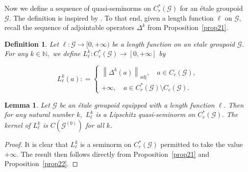 \documentclass[a4paper,11pt,reqno]{amsart}
\theoremstyle{plain}
\newtheorem{lem}[thm]{Lemma}
\newtheorem{defn}[thm]{Definition}
\theoremstyle{named}
\numberwithin{equation}{section}
\begin{document}
			
			Now we define a sequence of quasi-seminorms on $C^{\ast}_{r}(\mathcal G)$ for an étale groupoid $\mathcal G.$ The definition is inspired by \cite[Section 3]{Long-Wu-2017-Twisted-group-C-alg-as-CQMS}. To that end, given a length function $\ell$ on $\mathcal G$, recall the sequence of adjointable operators $\Delta^{k}$ from Proposition~\ref{prop21}.
			\begin{defn}\label{defn12}
				Let $\ell :\mathcal{G}\to [0,+\infty)$ be a length function on an etale groupoid $\mathcal{G}$.  For any $k \in \mathbb N,$ we define $L_{\ell}^{k}:C_{r}^{\ast}(\mathcal{G})\to [0,+\infty]$ by
				
				$$L_{\ell}^k (a) : = \begin{cases} \left \|\Delta^k (a) \right \|_{\mathrm {adj}}, \quad a \in C_c (\mathcal G), \\ + \infty, \quad a \in C_r^{\ast} (\mathcal G) \setminus C_c (\mathcal G). \end{cases}$$
			\end{defn}
			
			\begin{lem}
				Let $\mathcal G$ be an étale groupoid equipped with a length function $\ell$. Then for any natural number $k,$ $L_{\ell}^k$ is a Lipschitz quasi-seminorm on $C_r^{\ast} (\mathcal G).$ The kernel of $L_{\ell}^{k}$ is $C(\mathcal G^{(0)})$ for all $k$.
			\end{lem}
			
			\begin{proof}
				It is clear that $L_{\ell}^k$ is a seminorm on $C_r^{\ast} (\mathcal G)$ permitted to take the value $+\infty.$ The result then follows directly from Proposition~\ref{prop21} and Proposition~\ref{prop22}.
			\end{proof}
			
\end{document}
